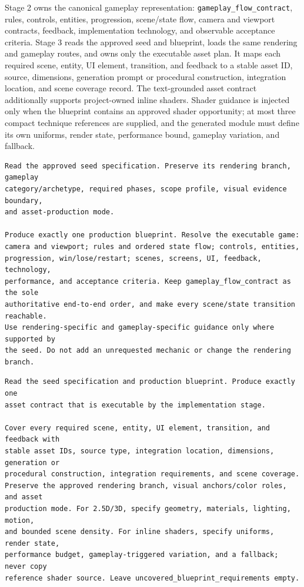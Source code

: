 \documentclass{article}
\begin{document}
Stage 2 owns the canonical gameplay representation: \texttt{gameplay\_flow\_contract}, rules, controls, entities, progression, scene/state flow, camera and viewport contracts, feedback, implementation technology, and observable acceptance criteria. Stage 3 reads the approved seed and blueprint, loads the same rendering and gameplay routes, and owns only the executable asset plan. It maps each required scene, entity, UI element, transition, and feedback to a stable asset ID, source, dimensions, generation prompt or procedural construction, integration location, and scene coverage record. The text-grounded asset contract additionally supports project-owned inline shaders. Shader guidance is injected only when the blueprint contains an approved shader opportunity; at most three compact technique references are supplied, and the generated module must define its own uniforms, render state, performance bound, gameplay variation, and fallback.

\begin{tcolorbox}[enhanced,breakable,colback=white,colframe=black,title=\textbf{Prompt: Stage-2 Game Production Blueprint},fonttitle=\small]
\begin{Verbatim}[fontsize=\scriptsize]
Read the approved seed specification. Preserve its rendering branch, gameplay
category/archetype, required phases, scope profile, visual evidence boundary,
and asset-production mode.

Produce exactly one production blueprint. Resolve the executable game:
camera and viewport; rules and ordered state flow; controls, entities,
progression, win/lose/restart; scenes, screens, UI, feedback, technology,
performance, and acceptance criteria. Keep gameplay_flow_contract as the sole
authoritative end-to-end order, and make every scene/state transition reachable.
Use rendering-specific and gameplay-specific guidance only where supported by
the seed. Do not add an unrequested mechanic or change the rendering branch.
\end{Verbatim}
\end{tcolorbox}

\begin{tcolorbox}[enhanced,breakable,colback=white,colframe=black,title=\textbf{Prompt: Stage-3 Asset Contract},fonttitle=\small]
\begin{Verbatim}[fontsize=\scriptsize]
Read the seed specification and production blueprint. Produce exactly one
asset contract that is executable by the implementation stage.

Cover every required scene, entity, UI element, transition, and feedback with
stable asset IDs, source type, integration location, dimensions, generation or
procedural construction, integration requirements, and scene coverage.
Preserve the approved rendering branch, visual anchors/color roles, and asset
production mode. For 2.5D/3D, specify geometry, materials, lighting, motion,
and bounded scene density. For inline shaders, specify uniforms, render state,
performance budget, gameplay-triggered variation, and a fallback; never copy
reference shader source. Leave uncovered_blueprint_requirements empty.
\end{Verbatim}
\end{tcolorbox}
\end{document}
